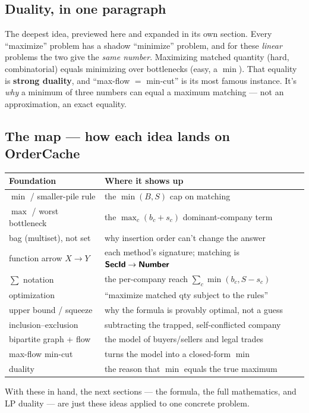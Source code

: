 \subsection{Duality, in one paragraph}

The deepest idea, previewed here and expanded in its own section. Every ``maximize''
problem has a shadow ``minimize'' problem, and for these \emph{linear} problems the
two give the \emph{same number}. Maximizing matched quantity (hard, combinatorial)
equals minimizing over bottlenecks (easy, a $\min$). That equality is
\textbf{strong duality}, and ``max-flow $=$ min-cut'' is its most famous instance.
It's \emph{why} a minimum of three numbers can equal a maximum matching --- not an
approximation, an exact equality.

\subsection{The map --- how each idea lands on \textsf{OrderCache}}

\begin{center}
\renewcommand{\arraystretch}{1.3}\footnotesize
\begin{tabular}{@{}ll@{}}
\toprule
\textbf{Foundation} & \textbf{Where it shows up} \\
\midrule
$\min$ / smaller-pile rule & the $\min(B,S)$ cap on matching \\
$\max$ / worst bottleneck & the $\max_c(b_c+s_c)$ dominant-company term \\
bag (multiset), not set & why insertion order can't change the answer \\
function arrow $X\to Y$ & each method's signature; matching is $\textsf{\textbf{SecId}}\to\textsf{\textbf{Number}}$ \\
$\sum$ notation & the per-company reach $\sum_c\min(b_c,S-s_c)$ \\
optimization & ``maximize matched qty subject to the rules'' \\
upper bound / squeeze & why the formula is provably optimal, not a guess \\
inclusion--exclusion & subtracting the trapped, self-conflicted company \\
bipartite graph + flow & the model of buyers/sellers and legal trades \\
max-flow min-cut & turns the model into a closed-form $\min$ \\
duality & the reason that $\min$ equals the true maximum \\
\bottomrule
\end{tabular}
\end{center}

\noindent With these in hand, the next sections --- the formula, the full
mathematics, and LP duality --- are just these ideas applied to one concrete
problem.
